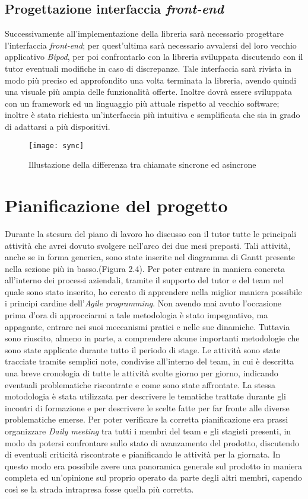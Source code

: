 \subsection{Progettazione interfaccia \textit{front-end}}
Successivamente all'implementazione della libreria sarà necessario progettare l'interfaccia \textit{front-end}; per quest'ultima sarà necessario avvalersi del loro vecchio applicativo \textit{Bipod}, per poi confrontarlo con la libreria sviluppata discutendo con il tutor eventuali modifiche in caso di discrepanze. Tale interfaccia sarà rivista in modo più preciso ed approfondito una volta terminata la libreria, avendo quindi una visuale più ampia delle funzionalità offerte. Inoltre dovrà essere sviluppata con un framework ed un linguaggio più attuale rispetto al vecchio software; inoltre è stata richiesta un'interfaccia più intuitiva e semplificata che sia in grado di adattarsi a più dispositivi.
\begin{figure}[!h] 
	\centering 
	\texttt{[image: sync]} 
	\caption{Illustazione della differenza tra chiamate sincrone ed asincrone}
\end{figure}
\newpage
\section{Pianificazione del progetto}
Durante la stesura del piano di lavoro ho discusso con il tutor tutte le principali attività che avrei dovuto svolgere nell'arco dei due mesi preposti. Tali attività, anche se in forma generica, sono state inserite nel diagramma di Gantt presente nella sezione più in basso.(Figura 2.4).
Per poter entrare in maniera concreta all'interno dei processi aziendali, tramite il supporto del tutor e del team nel quale sono stato inserito, ho cercato di apprendere nella miglior maniera possibile i principi cardine dell'\textit{Agile programming}. Non avendo mai avuto l'occasione prima d'ora di approcciarmi a tale metodologia è stato impegnativo, ma appagante, entrare nei suoi meccanismi pratici e nelle sue dinamiche. Tuttavia sono riuscito, almeno in parte, a comprendere alcune importanti metodologie che sono state applicate durante tutto il periodo di stage. Le attività sono state tracciate tramite semplici note, condivise all'interno del team, in cui è descritta una breve cronologia di tutte le attività svolte giorno per giorno, indicando eventuali problematiche riscontrate e come sono state affrontate. La stessa motodologia è stata utilizzata per descrivere le tematiche trattate durante gli incontri di formazione e per descrivere le scelte fatte per far fronte alle diverse problematiche emerse.
Per poter verificare la corretta pianificazione era prassi organizzare \textit{Daily meeting} tra tutti i membri del team e gli stagisti presenti, in modo da potersi confrontare sullo stato di avanzamento del prodotto, discutendo di eventuali criticità riscontrate e pianificando le attività per la giornata. In questo modo era possibile avere una panoramica generale sul prodotto in maniera completa ed un'opinione sul proprio operato da parte degli altri membri, capendo così se la strada intrapresa fosse quella più corretta.
\newpage
